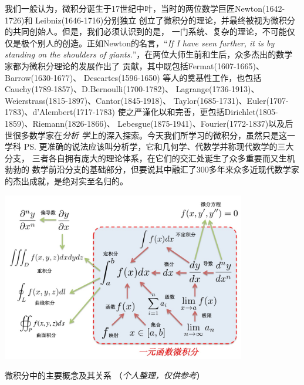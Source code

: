 我们一般认为，微积分诞生于17世纪中叶，当时的两位数学巨匠Newton(1642-1726)和
Leibniz(1646-1716)分别独立
创立了微积分的理论，并最终被视为微积分的共同创始人。但是，我们必须认识到的是，
一门系统、复杂的理论，不可能仅仅是极个别人的创造。正如Newton的名言，“{\it If 
I have seen further, it is by standing on the shoulders of
giants.}”，在两位大师生前和生后，众多杰出的数学家都为微积分理论的发展作出了
贡献，其中既包括Fermat(1607-1665)、Barrow(1630-1677)、
Descartes(1596-1650)%
等人的奠基性工作，也包括Cauchy(1789-1857)、D.Bernoulli(1700-1782)、
Lagrange(1736-1913)、Weierstrass(1815-1897)、Cantor(1845-1918)、
Taylor(1685-1731)、Euler(1707-1783)、d'Alembert(1717-1783)
使之严谨化以和完善，更包括Dirichlet(1805-1859)、Riemann(1826-1866)、
Lebesgue(1875-1941)、Fourier(1772-1837)以及后世很多数学家在{\it 分析
学}上的深入探索。今天我们所学习的微积分，虽然只是这一学科
\ps{更准确的说法应该叫分析学，它和几何学、代数学并称现代数学的三大分支，
三者各自拥有庞大的理论体系，在它们的交汇处诞生了众多重要而又生机勃勃的
数学前沿分支}的基础部分，但要说其中融汇了300多年来众多近现代数学家
的杰出成就，是绝对实至名归的。



\begin{center}
	\includegraphics[width=0.8\textwidth]{./images/ch1/AM_architecture.jpg}
	
	{微积分中的主要概念及其关系\;
	（{\it 个人整理，仅供参考}）}
\end{center}


